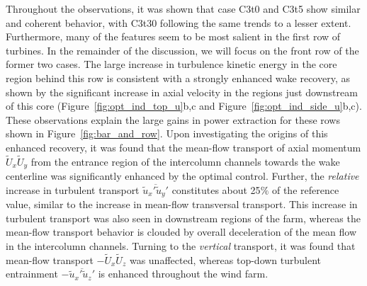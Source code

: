 	 Throughout the observations, it was shown that case C3t0 and C3t5 show similar and coherent behavior, with C3t30 following the same trends to a lesser extent. Furthermore, many of the features seem to be most salient in the first row of turbines. In the remainder of the discussion, we will focus on the front row of the former two cases. The large increase in turbulence kinetic energy in the core region behind this row is consistent with a strongly enhanced wake recovery, as shown by the significant increase in axial velocity in the regions just downstream of this core (Figure~\ref{fig:opt_ind_top_u}b,c and Figure~\ref{fig:opt_ind_side_u}b,c). These observations explain the large gains in power extraction for these rows shown in Figure~\ref{fig:bar_and_row}. Upon investigating the origins of this enhanced recovery, it was found that the mean-flow transport of axial momentum $\widetilde{U}_x \widetilde{U}_y$ from the entrance region of the intercolumn channels towards the wake centerline was significantly enhanced by the optimal control. Further, the \emph{relative} increase in turbulent transport $\overline{\widetilde{u}_x' \widetilde{u}_y'}$ constitutes about 25$\%$ of the reference value, similar to the increase in mean-flow transversal transport. This increase in turbulent transport was also seen in downstream regions of the farm, whereas the mean-flow transport behavior is clouded by overall deceleration of the mean flow in the intercolumn channels. Turning to the \emph{vertical} transport, it was found that mean-flow transport $-\widetilde{U}_x \widetilde{U}_z$ was unaffected, whereas top-down turbulent entrainment $- \overline{\widetilde{u}_x' \widetilde{u}_z'}$ is enhanced throughout the wind farm. 

